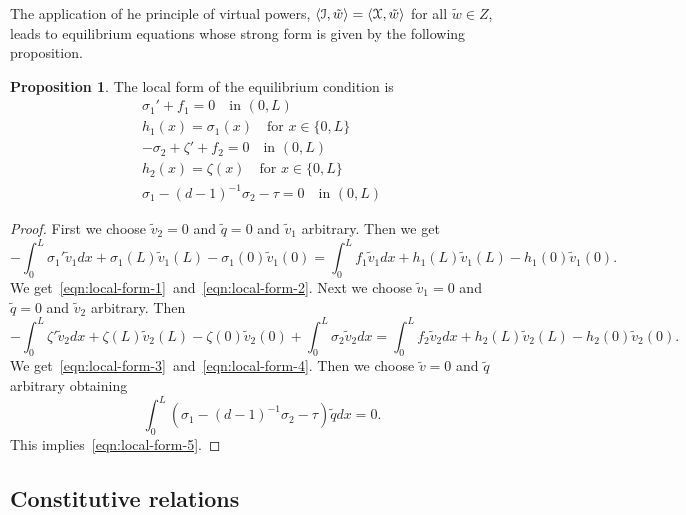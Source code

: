 \documentclass[a4paper,10pt,oneside]{amsbook}
\numberwithin{section}{chapter}
\numberwithin{equation}{chapter}
\theoremstyle{definition}
\newtheorem{prop}{Proposition}[chapter]
\DeclarePairedDelimiter{\dual}{\langle}{\rangle}
\begin{document}
The application of he principle of virtual powers, $\dual{\mathcal{I},\tilde w}=\dual{\mathcal{X},\tilde w}$ for all $\tilde w\in Z$, leads to equilibrium equations whose strong form is given by the following proposition.
\begin{prop}
The local form of the equilibrium condition is
\begin{subequations}
\begin{gather}
\sigma_1'+f_1=0\quad\text{in $(0,L)$} \label{eqn:local-form-1}\\
h_1(x)=\sigma_1(x)\quad\text{for $x\in\{0,L\}$} \label{eqn:local-form-2}\\
-\sigma_2+\zeta'+f_2=0\quad\text{in $(0,L)$} \label{eqn:local-form-3}\\
h_2(x)=\zeta(x)\quad\text{for $x\in\{0,L\}$} \label{eqn:local-form-4}\\
\sigma_1-(d-1)^{-1}\sigma_2-\tau=0\quad\text{in $(0,L)$} \label{eqn:local-form-5}
\end{gather}
\end{subequations}
\end{prop}
\begin{proof}
First we choose $\tilde v_2=0$ and $\tilde q=0$ and $\tilde v_1$ arbitrary. Then we get
\[
-\int_0^L\sigma_1'\tilde v_1dx+\sigma_1(L)\tilde v_1(L)-\sigma_1(0)\tilde v_1(0)=\int_0^Lf_1\tilde v_1dx+h_1(L)\tilde v_1(L)-h_1(0)\tilde v_1(0).
\]
We get~\eqref{eqn:local-form-1}~and~\eqref{eqn:local-form-2}. Next we choose $\tilde v_1=0$ and $\tilde q=0$ and $\tilde v_2$ arbitrary. Then
\[
-\int_0^L\zeta'\tilde v_2dx+\zeta(L)\tilde v_2(L)-\zeta(0)\tilde v_2(0)+\int_0^L\sigma_2\tilde v_2dx=\int_0^Lf_2\tilde v_2dx+h_2(L)\tilde v_2(L)-h_2(0)\tilde v_2(0).
\]
We get~\eqref{eqn:local-form-3}~and~\eqref{eqn:local-form-4}. Then we choose $\tilde v=0$ and $\tilde q$ arbitrary obtaining
\[
\int_0^L(\sigma_1-(d-1)^{-1}\sigma_2-\tau)\tilde qdx=0.
\]
This implies~\eqref{eqn:local-form-5}.
\end{proof}

\subsection{Constitutive relations}
\end{document}
